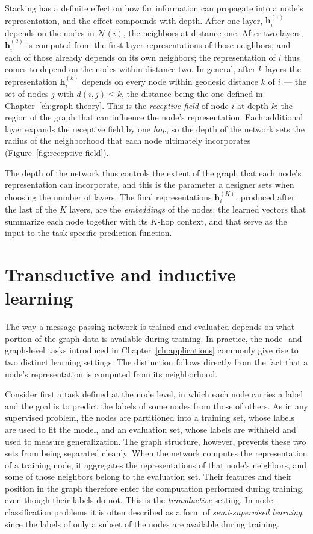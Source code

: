 Stacking has a definite effect on how far information can propagate into a 
node's representation, and the effect compounds with depth. After one layer,
$\mathbf{h}_i^{(1)}$ depends on the nodes in $\mathcal{N}(i)$, the neighbors at
distance one. After two layers, $\mathbf{h}_i^{(2)}$ is computed from the
first-layer representations of those neighbors, and each of those already
depends on its own neighbors; the representation of $i$ thus comes to depend on
the nodes within distance two. In general, after $k$ layers the representation
$\mathbf{h}_i^{(k)}$ depends on every node within geodesic distance $k$ of $i$
--- the set of nodes $j$ with $d(i, j) \le k$, the distance being the one
defined in Chapter~\ref{ch:graph-theory}. This is the \textit{receptive
field} of node $i$ at depth $k$: the region of the graph that can influence the
node's representation. Each additional layer expands the receptive field by one
\textit{hop}, so the depth of the network sets the radius of the neighborhood that each
node ultimately incorporates (Figure~\ref{fig:receptive-field}).

The depth of the network thus controls the extent of the graph that each node's
representation can incorporate, and this is the parameter a designer sets when
choosing the number of layers. The final representations $\mathbf{h}_i^{(K)}$,
produced after the last of the $K$ layers, are the \textit{embeddings} of the
nodes: the learned vectors that summarize each node together with its
$K$-hop context, and that serve as the input to the task-specific prediction function.

\section{Transductive and inductive learning}
\label{sec:transductive-inductive}
 
The way a message-passing network is trained and evaluated depends on what
portion of the graph data is available during training. In practice, the node-
and graph-level tasks introduced in Chapter~\ref{ch:applications} commonly
give rise to two distinct learning settings. The distinction follows directly
from the fact that a node's representation is computed from its neighborhood.
 
Consider first a task defined at the node level, in which each node carries a
label and the goal is to predict the labels of some nodes from those of others.
As in any supervised problem, the nodes are partitioned into a training set,
whose labels are used to fit the model, and an evaluation set, whose labels are
withheld and used to measure generalization. The graph structure, however,
prevents these two sets from being separated cleanly. When the network computes
the representation of a training node, it aggregates the representations of that
node's neighbors, and some of those neighbors belong to the evaluation set.
Their features and their position in the graph therefore enter the computation
performed during training, even though their labels do not. This is 
the \textit{transductive} setting. In node-classification problems it
is often described as a form of \textit{semi-supervised learning}, since the
labels of only a subset of the nodes are available during training.
 
